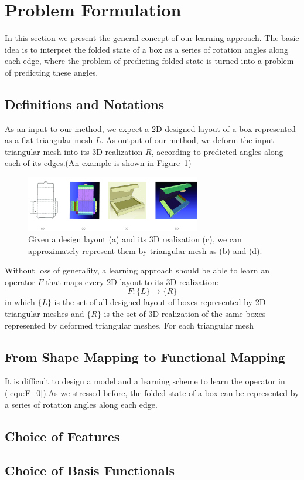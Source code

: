 \section{Problem Formulation}
In this section we present the general concept of our learning approach. The basic idea is to interpret the folded state of a box as a series of rotation angles along each edge, where the problem of predicting folded state is turned into a problem of predicting these angles. 
\subsection{Definitions and Notations}
As an input to our method, we expect a 2D designed layout of a box represented as a flat triangular mesh $L$. As output of our method, we deform the input triangular mesh into its 3D realization $R$, according to predicted angles along each of its edges.(An example is shown in Figure~\ref{fig:approximation})\\
\begin{figure}
	\centering
	\includegraphics[width=3.0in]{images/approximation.jpg}
	\caption{Given a design layout (a) and its 3D realization (c), we can approximately represent them by triangular mesh as (b) and (d).}
	\label{fig:approximation}
\end{figure}
Without loss of generality, a learning approach should be able to learn an operator $F$ that maps every 2D layout to its 3D realization:
\begin{equation}
F:\{L\}\rightarrow\{R\}
\label{equ:F_0}
\end{equation}
in which $\{L\}$ is the set of all designed layout of boxes represented by 2D triangular meshes and $\{R\}$ is the set of 3D realization of the same boxes represented by deformed triangular meshes. For each triangular mesh 
\subsection{From Shape Mapping to Functional Mapping}
It is difficult to design a model and a learning scheme to learn the operator in (\ref{equ:F_0}).As we stressed before, the folded state of a box can be represented by a series of rotation angles along each edge.
\subsection{Choice of Features}
\subsection{Choice of Basis Functionals}
